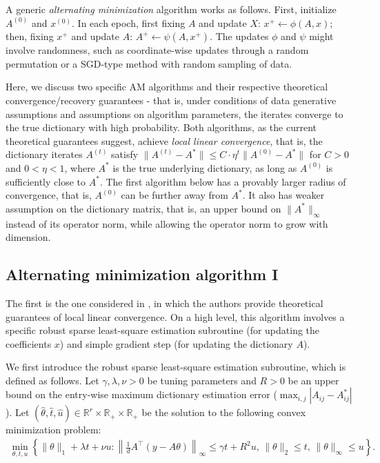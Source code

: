 
A generic \textit{alternating minimization} algorithm works as follows. First, initialize $A^{(0)}$ and $x^{(0)}$. In each epoch, first fixing $A$ and update $X$: $x^+ \leftarrow \phi(A, x)$; then, fixing $x^+$ and update $A$: $A^+ \leftarrow \psi(A, x^+)$. The updates $\phi$ and $\psi$ might involve randomness, such as coordinate-wise updates through a random permutation or a SGD-type method with random sampling of data. 

Here, we discuss two specific AM algorithms and their respective theoretical convergence/recovery guarantees - that is, under conditions of data generative assumptions and assumptions on algorithm parameters, the iterates converge to the true dictionary with high probability. Both algorithms, as the current theoretical guarantees suggest, achieve \textit{local linear convergence}, that is, the dictionary iterates $A^{(t)}$ satisfy $\|A^{(t)} - A^*\| \leq C \cdot \eta^t \|A^{(0)} - A^*\|$ for $C>0$ and $0<\eta<1$, where $A^*$ is the true underlying dictionary, as long as $A^{(0)}$ is sufficiently close to $A^*$. The first algorithm below has a provably larger radius of convergence, that is, $A^{(0)}$ can be further away from $A^*$. It also has weaker assumption on the dictionary matrix, that is, an upper bound on $\|A^*\|_\infty$ instead of its operator norm, while allowing the operator norm to grow with dimension. 

\subsection{Alternating minimization algorithm I}
The first is the one considered in \cite{chatterji2017alternating}, in which the authors provide theoretical guarantees of local linear convergence. On a high level, this algorithm involves a specific robust sparse least-square estimation subroutine (for updating the coefficients $x$) and simple gradient step (for updating the dictionary $A$).

We first introduce the robust sparse least-square estimation subroutine, which is defined as follows. Let $\gamma, \lambda, \nu > 0$ be tuning parameters and $R>0$ be an upper bound on the entry-wise maximum dictionary estimation error ($\max_{i,j} |A_{ij} - A^*_{ij}|$). Let $(\hat{\theta}, \hat{t}, \hat{u})\in \mathbb{R}^r \times \mathbb{R}_+\times \mathbb{R}_+$ be the solution to the following convex minimization problem: 
\begin{align}
    \min_{\theta,t,u}\left\{ \|\theta\|_1 + \lambda t + \nu u : \left\|\frac{1}{d} A^\top (y- A\theta) \right\|_\infty\leq \gamma t + R^2 u,\, \|\theta\|_2 \leq t,\, \|\theta\|_\infty\leq u \right\}. \label{eq:mu-selector}
\end{align}

